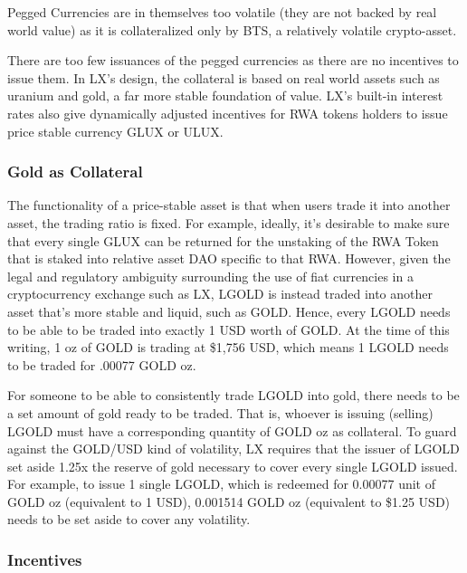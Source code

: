 \documentclass[11pt]{article}
\begin{document}
Pegged Currencies are in themselves too volatile (they are not backed by real world value) as it is collateralized only by BTS, a relatively volatile crypto-asset.


There are too few issuances of the pegged currencies as there are no incentives to issue them. In LX's design, the collateral is based on real world assets such as uranium and gold, a far more stable foundation of value. LX's built-in interest rates also give dynamically adjusted incentives for RWA tokens holders to issue price stable currency GLUX or ULUX.


\subsubsection{Gold as Collateral}

The functionality of a price-stable asset is that when users trade it into another asset, the trading ratio is fixed. For example, ideally, it's desirable to make sure that every single GLUX can be returned for the unstaking of the RWA Token that is staked into relative asset DAO specific to that RWA. However, given the legal and regulatory ambiguity surrounding the use of fiat currencies in a cryptocurrency exchange such as LX, LGOLD is instead traded into another asset that's more stable and liquid, such as GOLD. Hence, every LGOLD needs to be able to be traded into exactly 1 USD worth of GOLD. At the time of this writing, 1 oz of GOLD is trading at \$1,756 USD, which means 1 LGOLD needs to be traded for .00077 GOLD oz.


For someone to be able to consistently trade LGOLD into gold, there needs to be a set amount of gold ready to be traded. That is, whoever is issuing (selling) LGOLD must have a corresponding quantity of GOLD oz as collateral. To guard against the GOLD/USD kind of volatility, LX requires that the issuer of LGOLD set aside 1.25x the reserve of gold necessary to cover every single LGOLD issued. For example, to issue 1 single LGOLD, which is redeemed for 0.00077 unit of GOLD oz (equivalent to 1 USD), 0.001514 GOLD oz (equivalent to \$1.25 USD) needs to be set aside to cover any volatility.


\subsubsection{Incentives}
\end{document}
